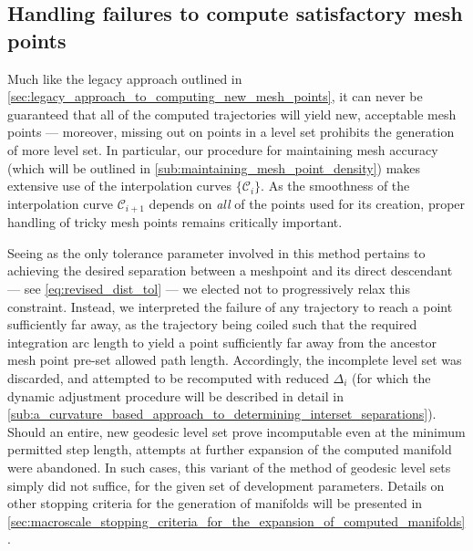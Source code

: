 \subsection{Handling failures to compute satisfactory mesh points}
\label{sub:handling_failures_to_compute_satisfactory_mesh_points_revised}

Much like the legacy approach outlined in
\cref{sec:legacy_approach_to_computing_new_mesh_points}, it can never be
guaranteed that all of the computed trajectories will yield new, acceptable
mesh points --- moreover, missing out on points in a level set prohibits
the generation of more level set. In particular, our procedure for maintaining
mesh accuracy (which will be outlined in
\cref{sub:maintaining_mesh_point_density}) makes extensive use of the
interpolation curves $\{\mathcal{C}_{i}\}$. As the smoothness of the
interpolation curve $\mathcal{C}_{i+1}$ depends on \emph{all} of the points used
for its creation, proper handling of tricky mesh points remains critically
important.

Seeing as the only tolerance parameter involved in this method pertains to
achieving the desired separation between a meshpoint and its direct descendant
--- see \cref{eq:revised_dist_tol} --- we elected not to progressively relax
this  constraint. Instead, we interpreted the failure of any trajectory to reach
a point sufficiently far away, as the trajectory being coiled such that the
required integration arc length to yield a point sufficiently far away from
the ancestor mesh point pre-set allowed path length. Accordingly, the incomplete
level set was discarded, and attempted to be recomputed with reduced
$\Delta_{i}$ (for which the dynamic adjustment procedure will be described
in detail in
\cref{sub:a_curvature_based_approach_to_determining_interset_separations}).
Should an entire, new geodesic level set prove incomputable even at the
minimum permitted step length, attempts at further expansion of the computed
manifold were abandoned. In such cases, this variant of the method of geodesic
level sets simply did not suffice, for the given set of development parameters.
Details on other stopping criteria for the generation of manifolds will be
presented in
\cref{sec:macroscale_stopping_criteria_for_the_expansion_of_computed_manifolds}.

